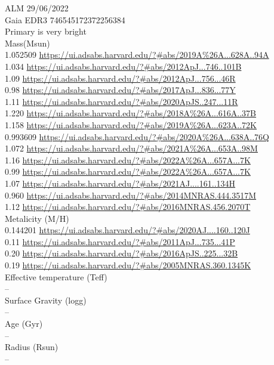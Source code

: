 ALM 29/06/2022\\
Gaia EDR3 746545172372256384\\
Primary is very bright\\
Mass(Msun)\\
1.052509 \url{https://ui.adsabs.harvard.edu/?#abs/2019A%26A...628A..94A}\\
1.034 \url{https://ui.adsabs.harvard.edu/?#abs/2012ApJ...746..101B}\\
1.09 \url{https://ui.adsabs.harvard.edu/?#abs/2012ApJ...756...46R}\\
0.98 \url{https://ui.adsabs.harvard.edu/?#abs/2017ApJ...836...77Y}\\
1.11 \url{https://ui.adsabs.harvard.edu/?#abs/2020ApJS..247...11R}\\
1.220 \url{https://ui.adsabs.harvard.edu/?#abs/2018A%26A...616A..37B}\\
1.158 \url{https://ui.adsabs.harvard.edu/?#abs/2019A%26A...623A..72K}\\
0.993609 \url{https://ui.adsabs.harvard.edu/?#abs/2020A%26A...638A..76Q}\\
1.072 \url{https://ui.adsabs.harvard.edu/?#abs/2021A%26A...653A..98M}\\
1.16 \url{https://ui.adsabs.harvard.edu/?#abs/2022A%26A...657A...7K}\\
0.99 \url{https://ui.adsabs.harvard.edu/?#abs/2022A%26A...657A...7K}\\
1.07 \url{https://ui.adsabs.harvard.edu/?#abs/2021AJ....161..134H}\\
0.960 \url{https://ui.adsabs.harvard.edu/?#abs/2014MNRAS.444.3517M}\\
1.12 \url{https://ui.adsabs.harvard.edu/?#abs/2016MNRAS.456.2070T}\\
Metalicity (M/H)\\
0.144201 \url{https://ui.adsabs.harvard.edu/?#abs/2020AJ....160..120J}\\
0.11 \url{https://ui.adsabs.harvard.edu/?#abs/2011ApJ...735...41P}\\
0.20 \url{https://ui.adsabs.harvard.edu/?#abs/2016ApJS..225...32B}\\
0.19 \url{https://ui.adsabs.harvard.edu/?#abs/2005MNRAS.360.1345K}\\
Effective temperature (Teff) \\
--\\
Surface Gravity (logg) \\
--\\
Age (Gyr)\\
--\\
Radius (Rsun)\\
--\\

